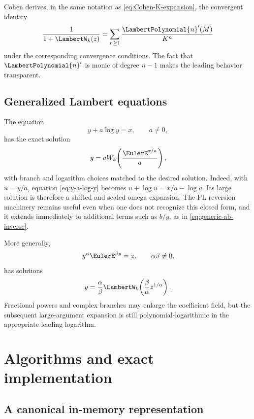 \documentclass[11pt,oneside]{article}
\numberwithin{equation}{section}
\theoremstyle{definition}
\begin{document}
Cohen derives, in the same notation as \eqref{eq:Cohen-K-expansion}, the
convergent identity
\begin{equation}\label{eq:W-denominator-Ln}
  \frac{1}{1+\LambertW_k(z)}
  =\sum_{n\ge1}\frac{{\LambertPolynomial{n}}'(M)}{K^n}
\end{equation}
under the corresponding convergence conditions.  The fact that \({\LambertPolynomial{n}}'\) is
monic of degree \(n-1\) makes the leading behavior transparent.

\subsection{Generalized Lambert equations}

The equation
\begin{equation}\label{eq:y-a-log-y}
  y+a\log y=x,
  \qquad a\ne0,
\end{equation}
has the exact solution
\begin{equation}\label{eq:y-a-log-y-solution}
  y=aW_k\!\left(\frac{\EulerE^{x/a}}{a}\right),
\end{equation}
with branch and logarithm choices matched to the desired solution.  Indeed, with
\(u=y/a\), equation \eqref{eq:y-a-log-y} becomes
\(u+\log u=x/a-\log a\).  Its large solution is therefore a shifted and scaled
omega expansion.  The PL reversion machinery remains useful even when one does
not recognize this closed form, and it extends immediately to additional terms
such as \(b/y\), as in \eqref{eq:generic-ab-inverse}.

More generally,
\begin{equation}\label{eq:power-exponential-equation}
  y^\alpha \EulerE^{\beta y}=z,
  \qquad \alpha\beta\ne0,
\end{equation}
has solutions
\begin{equation}\label{eq:power-exponential-solution}
  y=\frac{\alpha}{\beta}
  \LambertW_k\!\left(\frac{\beta}{\alpha}z^{1/\alpha}\right).
\end{equation}
Fractional powers and complex branches may enlarge the coefficient field, but
the subsequent large-argument expansion is still polynomial-logarithmic in the
appropriate leading logarithm.

\section{Algorithms and exact implementation}\label{sec:implementation}

\subsection{A canonical in-memory representation}
\end{document}
